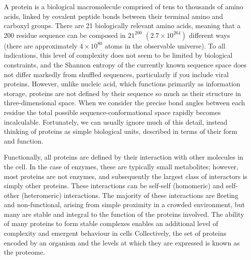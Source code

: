 \documentclass[a4paper,11pt,twoside,openright]{book}
\begin{document}
A protein is a biological macromolecule comprised of tens to thousands of amino acids, linked by covalent peptide bonds between their terminal amino and carboxyl groups. There are 21 biologically relevant amino acids, meaning that a 200 residue sequence can be composed in \(21^{200}\)  \((2.7\times10^{264})\) different ways (there are approximately \(4\times10^{80}\) atoms in the observable universe). To all indications, this level of complexity does not seem to be limited by biological constraints, and the Shannon entropy of the currently known sequence space does not differ markedly from shuffled sequences, particularly if you include viral proteins. However, unlike nucleic acid, which functions primarily as information storage, proteins are not defined by their sequence so much as their structure in three-dimensional space. When we consider the precise bond angles between each residue the total possible sequence-conformational space rapidly becomes incalculable. Fortunately, we can usually ignore much of this detail, instead thinking of proteins as simple biological units, described in terms of their form and function.

Functionally, all proteins are defined by their interaction with other molecules in the cell. In the case of enzymes, these are typically small metabolites; however, most proteins are not enzymes, and subsequently the largest class of interactors is simply other proteins. These interactions can be self-self (homomeric) and self-other (heteromeric) interactions. The majority of these interactions are fleeting and non-functional, arising from simple proximity in a crowded environment, but many are stable and integral to the function of the proteins involved. The ability of many proteins to form stable complexes enables an additional level of complexity and emergent behaviour in cells
Collectively, the set of proteins encoded by an organism and the levels at which they are expressed is known as the proteome.
\end{document}
